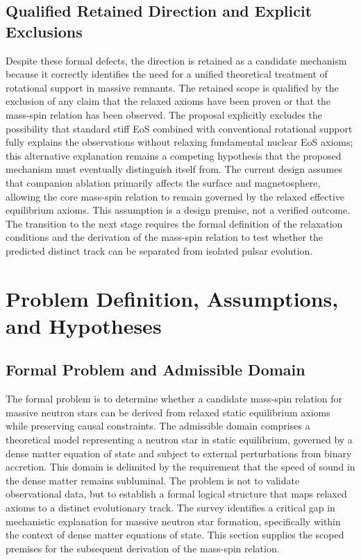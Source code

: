 \documentclass[conference]{IEEEtran}
\begin{document}
\subsection{Qualified Retained Direction and Explicit Exclusions}
Despite these formal defects, the direction is retained as a candidate mechanism because it correctly identifies the need for a unified theoretical treatment of rotational support in massive remnants. The retained scope is qualified by the exclusion of any claim that the relaxed axioms have been proven or that the mass-spin relation has been observed. The proposal explicitly excludes the possibility that standard stiff EoS combined with conventional rotational support fully explains the observations without relaxing fundamental nuclear EoS axioms; this alternative explanation remains a competing hypothesis that the proposed mechanism must eventually distinguish itself from. The current design assumes that companion ablation primarily affects the surface and magnetosphere, allowing the core mass-spin relation to remain governed by the relaxed effective equilibrium axioms. This assumption is a design premise, not a verified outcome. The transition to the next stage requires the formal definition of the relaxation conditions and the derivation of the mass-spin relation to test whether the predicted distinct track can be separated from isolated pulsar evolution.

\section{Problem Definition, Assumptions, and Hypotheses}
\subsection{Formal Problem and Admissible Domain}
The formal problem is to determine whether a candidate mass-spin relation for massive neutron stars can be derived from relaxed static equilibrium axioms while preserving causal constraints. The admissible domain comprises a theoretical model representing a neutron star in static equilibrium, governed by a dense matter equation of state and subject to external perturbations from binary accretion. This domain is delimited by the requirement that the speed of sound in the dense matter remains subluminal. The problem is not to validate observational data, but to establish a formal logical structure that maps relaxed axioms to a distinct evolutionary track. The survey identifies a critical gap in mechanistic explanation for massive neutron star formation, specifically within the context of dense matter equations of state. This section supplies the scoped premises for the subsequent derivation of the mass-spin relation.
\end{document}
